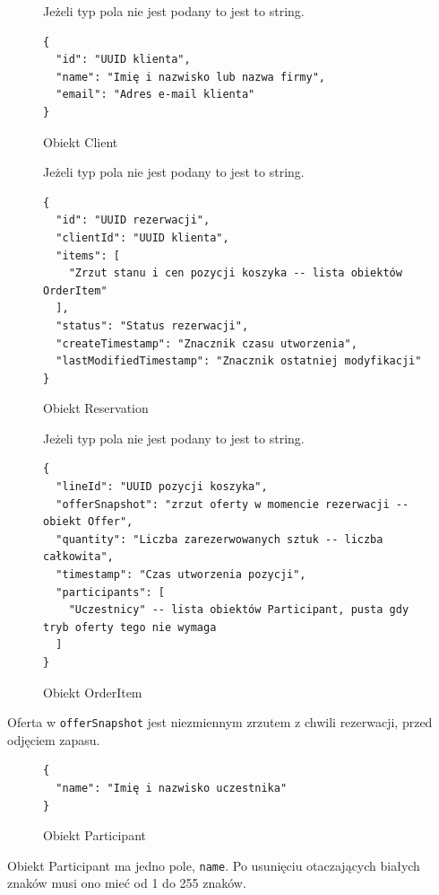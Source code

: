 \begin{figure}[H]
Jeżeli typ pola nie jest podany to jest to string.
\begin{verbatim}
{
  "id": "UUID klienta",
  "name": "Imię i nazwisko lub nazwa firmy",
  "email": "Adres e-mail klienta"
}
\end{verbatim}
\caption{Obiekt Client}
\label{schema:client}
\end{figure}

\begin{figure}[H]
Jeżeli typ pola nie jest podany to jest to string.
\begin{verbatim}
{
  "id": "UUID rezerwacji",
  "clientId": "UUID klienta",
  "items": [
    "Zrzut stanu i cen pozycji koszyka -- lista obiektów OrderItem"
  ],
  "status": "Status rezerwacji",
  "createTimestamp": "Znacznik czasu utworzenia",
  "lastModifiedTimestamp": "Znacznik ostatniej modyfikacji"
}
\end{verbatim}
\caption{Obiekt Reservation}
\label{schema:reservation}
\end{figure}

\begin{figure}[H]
Jeżeli typ pola nie jest podany to jest to string.
\begin{verbatim}
{
  "lineId": "UUID pozycji koszyka",
  "offerSnapshot": "zrzut oferty w momencie rezerwacji -- obiekt Offer",
  "quantity": "Liczba zarezerwowanych sztuk -- liczba całkowita",
  "timestamp": "Czas utworzenia pozycji",
  "participants": [
    "Uczestnicy" -- lista obiektów Participant, pusta gdy tryb oferty tego nie wymaga
  ]
}
\end{verbatim}
\caption{Obiekt OrderItem}
\label{schema:order-item}
\end{figure}

Oferta w \texttt{offerSnapshot} jest niezmiennym zrzutem z chwili rezerwacji,
przed odjęciem zapasu. 

\begin{figure}[H]
\begin{verbatim}
{
  "name": "Imię i nazwisko uczestnika"
}
\end{verbatim}
\caption{Obiekt Participant}
\label{schema:participant}
\end{figure}

Obiekt Participant ma jedno pole, \texttt{name}.
Po usunięciu otaczających białych znaków musi ono mieć od 1 do 255 znaków.